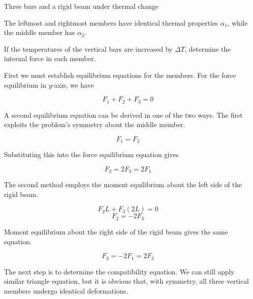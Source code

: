 \documentclass[
fontsize=10pt,
a4paper,
twosides=false,
open=any,
svgnames,
]{kaobook} %
\begin{document}
\begin{example} Three bars and a rigid beam under thermal change

  The leftmost and rightmost members have identical thermal properties $\alpha_1$, while the middle member has $\alpha_2$.

  \begin{figure}[H]
    \centering
  \end{figure}

  If the temperatures of the vertical bars are increased by $\Delta T$, determine the internal force in each member.

  First we must establish equilibrium equations for the members. For the force equilibrium in $y$-axis, we have

  $$ F_1 + F_2 + F_3 = 0 $$

  A second equilibrium equation can be derived in one of the two ways. The first exploits the problem's symmetry about the middle member.

  $$ F_1 = F_3 $$

  Substituting this into the force equilibrium equation gives

  $$ F_2 = 2F_3 = 2F_1 $$
  
  The second method employs the moment equilibrium about the left side of the rigid beam.

  $$ F_2 L + F_3 (2L) = 0 $$
  $$ F_2 = -2F_3 $$

  Moment equilibrium about the right side of the rigid beam gives the same equation.

  $$ F_2 = -2F_1 = 2F_3 $$

  The next step is to determine the compatibility equation. We can still apply similar triangle equation, but it is obvious that, with symmetry, all three vertical members undergo identical deformations. 


\end{example}
\end{document}
